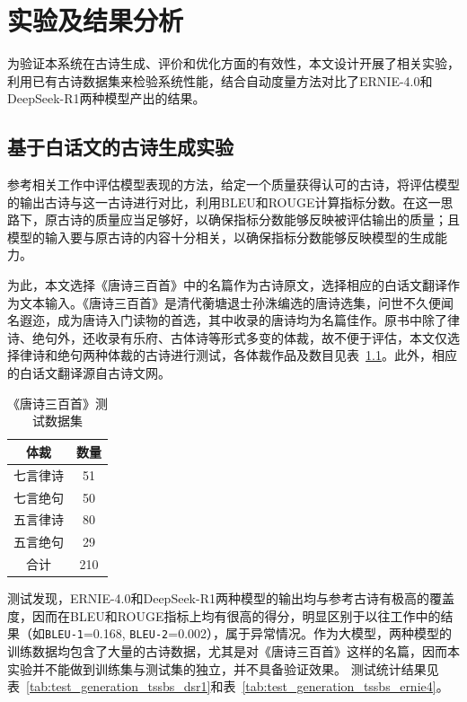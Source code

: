 
\chapter{实验及结果分析}

为验证本系统在古诗生成、评价和优化方面的有效性，本文设计开展了相关实验，利用已有古诗数据集来检验系统性能，结合自动度量方法对比了ERNIE-4.0和DeepSeek-R1两种模型产出的结果。

\section{基于白话文的古诗生成实验}

参考相关工作中评估模型表现的方法，给定一个质量获得认可的古诗，将评估模型的输出古诗与这一古诗进行对比，利用BLEU和ROUGE计算指标分数。在这一思路下，原古诗的质量应当足够好，以确保指标分数能够反映被评估输出的质量；且模型的输入要与原古诗的内容十分相关，以确保指标分数能够反映模型的生成能力。

为此，本文选择《唐诗三百首》中的名篇作为古诗原文，选择相应的白话文翻译作为文本输入。《唐诗三百首》是清代蘅塘退士孙洙编选的唐诗选集，问世不久便闻名遐迩，成为唐诗入门读物的首选，其中收录的唐诗均为名篇佳作。原书中除了律诗、绝句外，还收录有乐府、古体诗等形式多变的体裁，故不便于评估，本文仅选择律诗和绝句两种体裁的古诗进行测试，各体裁作品及数目见表~\ref{tab:test_generation_data}。此外，相应的白话文翻译源自古诗文网。

\begin{table}[ht]
    \centering
    \caption{《唐诗三百首》测试数据集}
    \label{tab:test_generation_data}
    \begin{tabular}{|c|c|}
      \hline
       \bf{体裁}& \bf{数量} \\
      \hline
      七言律诗& 51\\
      \hline
       七言绝句& 50\\
      \hline
       五言律诗& 80\\
      \hline
       五言绝句& 29\\
      \hline
       合计& 210\\
      \hline
    \end{tabular}
  \end{table}

测试发现，ERNIE-4.0和DeepSeek-R1两种模型的输出均与参考古诗有极高的覆盖度，因而在BLEU和ROUGE指标上均有很高的得分，明显区别于以往工作中的结果（如\verb|BLEU-1|=0.168, \verb|BLEU-2|=0.002），属于异常情况。作为大模型，两种模型的训练数据均包含了大量的古诗数据，尤其是对《唐诗三百首》这样的名篇，因而本实验并不能做到训练集与测试集的独立，并不具备验证效果。
测试统计结果见表~\ref{tab:test_generation_tssbs_dsr1}和表~\ref{tab:test_generation_tssbs_ernie4}。


